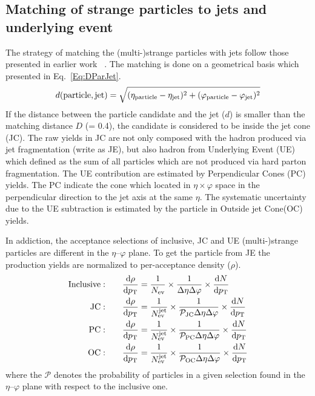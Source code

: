 \subsection{Matching of strange particles to jets and underlying event}
\label{SubSec:ParJetMatch}
The strategy of matching the (multi-)strange particles with jets follow those presented in earlier work~\cite{V0injet} . The matching is done on a geometrical basis which presented in Eq.~\ref{Eq:DParJet}.
\begin{equation}
	d(\mathrm{particle, jet}) = \sqrt{(\eta_\mathrm{particle} -\eta_{\rm jet})^{2} + (\varphi_\mathrm{particle} -\varphi_{\rm jet})^{2}}
	\label{Eq:DParJet}
\end{equation}
If the distance between the particle candidate and the jet ($d$) is smaller than the matching distance $D$ (= 0.4), the candidate is considered to be inside the jet cone (JC). The raw yields in JC are not only composed with the hadron produced via jet fragmentation (write as JE), but also hadron from Underlying Event (UE) which defined as the sum of all particles which are not produced via hard parton fragmentation. The UE contribution are estimated by Perpendicular Cones (PC) yields. The PC indicate the cone which located in $\eta \times \varphi$ space in the perpendicular direction to the jet axis at the same $\eta$. The systematic uncertainty due to the UE subtraction is estimated by the particle in Outside jet Cone(OC) yields. 

In addiction, the acceptance selections of inclusive, JC and UE (multi-)strange particles are different in the $\eta$--$\varphi$ plane. To get the particle from JE the production yields are normalized to per-acceptance density ($\rho$).
\begin{equation}
\begin{split}
{\rm Inclusive:}\qquad & \frac{\mathrm{d}\rho}{\mathrm{d}p_{\rm T}} = \frac{1}{N_{\rm ev}}\times\frac{1}{\Delta\eta\Delta\varphi}\times\frac{\mathrm{d} N}{\mathrm{d}p_{\rm T}} \\
{\rm JC:}\qquad & \frac{\mathrm{d}\rho}{\mathrm{d}p_{\rm T}} = \frac{1}{N_{\rm ev}^{\rm jet}} \times\frac{1}{\mathcal{P}_{\rm JC}\Delta\eta\Delta\varphi}\times\frac{\mathrm{d} N}{\mathrm{d}p_{\rm T}} \\
{\rm PC:}\qquad & \frac{\mathrm{d}\rho}{\mathrm{d}p_{\rm T}} = \frac{1}{N_{\rm ev}^{\rm jet}} \times\frac{1}{\mathcal{P}_{\rm PC}\Delta\eta\Delta\varphi}\times\frac{\mathrm{d} N}{\mathrm{d}p_{\rm T}} \\
{\rm OC:}\qquad & \frac{\mathrm{d}\rho}{\mathrm{d}p_{\rm T}} = \frac{1}{N_{\rm ev}^{\rm jet}} \times\frac{1}{\mathcal{P}_{\rm OC}\Delta\eta\Delta\varphi}\times\frac{\mathrm{d} N}{\mathrm{d}p_{\rm T}} \\
\end{split}
\end{equation}
where the $\mathcal{P}$ denotes the probability of particles in a given selection found in the $\eta$--$\varphi$ plane with respect to the inclusive one.

